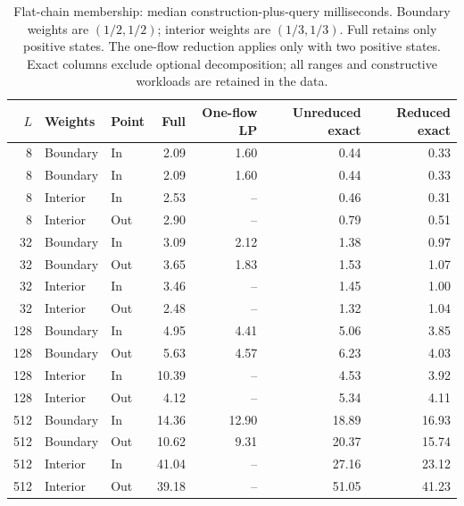 \begin{table}[tb]\centering\small
\caption{Flat-chain membership: median construction-plus-query milliseconds. Boundary weights are $(1/2,1/2)$; interior weights are $(1/3,1/3)$. Full retains only positive states. The one-flow reduction applies only with two positive states. Exact columns exclude optional decomposition; all ranges and constructive workloads are retained in the data.}
\label{tab:computation-flat}
\begin{tabular}{rllrrrr}\toprule
$L$ & Weights & Point & Full & One-flow LP & Unreduced exact & Reduced exact\\\midrule
8 & Boundary & In & 2.09 & 1.60 & 0.44 & 0.33 \\
8 & Boundary & In & 2.09 & 1.60 & 0.44 & 0.33 \\
8 & Interior & In & 2.53 & -- & 0.46 & 0.31 \\
8 & Interior & Out & 2.90 & -- & 0.79 & 0.51 \\
32 & Boundary & In & 3.09 & 2.12 & 1.38 & 0.97 \\
32 & Boundary & Out & 3.65 & 1.83 & 1.53 & 1.07 \\
32 & Interior & In & 3.46 & -- & 1.45 & 1.00 \\
32 & Interior & Out & 2.48 & -- & 1.32 & 1.04 \\
128 & Boundary & In & 4.95 & 4.41 & 5.06 & 3.85 \\
128 & Boundary & Out & 5.63 & 4.57 & 6.23 & 4.03 \\
128 & Interior & In & 10.39 & -- & 4.53 & 3.92 \\
128 & Interior & Out & 4.12 & -- & 5.34 & 4.11 \\
512 & Boundary & In & 14.36 & 12.90 & 18.89 & 16.93 \\
512 & Boundary & Out & 10.62 & 9.31 & 20.37 & 15.74 \\
512 & Interior & In & 41.04 & -- & 27.16 & 23.12 \\
512 & Interior & Out & 39.18 & -- & 51.05 & 41.23 \\
\bottomrule\end{tabular}\end{table}
